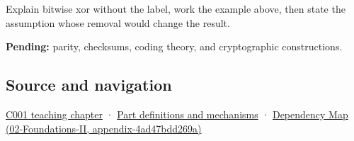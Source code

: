 Explain bitwise xor without the label, work the example above, then state the assumption whose removal would change the result.

\textbf{Pending:} parity, checksums, coding theory, and cryptographic constructions.

\subsection{Source and navigation}\label{source-and-navigation}

\href{Continuous\%20Notes/Computing\%20Foundations\%20-\%20From\%20Bits\%20to\%20C++\%20and\%20Systems\%20APIs\#From\%20a\%20signal\%20to\%20an\%20interpretation}{C001 teaching chapter} · \hyperref[appendix-fd090d982a15]{Part definitions and mechanisms} · \href{}{Dependency Map (02-Foundations-II, appendix-4ad47bdd269a)}
